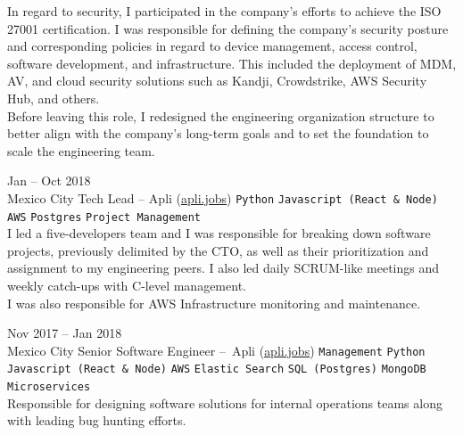 \documentclass[9pt]{developercv} %
\begin{document}
\begin{entrylist}
{            In regard to security, I participated in the company's efforts to achieve the ISO 27001 
            certification. I was responsible for defining the company's security posture and 
            corresponding policies in regard to device management, access control, software 
            development, and infrastructure. This included the deployment of MDM, AV, and cloud 
            security solutions such as Kandji, Crowdstrike, AWS Security Hub, and others.\\

            Before leaving this role, I redesigned the engineering organization structure to better 
            align with the company's long-term goals and to set the foundation to scale the 
            engineering team.
        }

    \entry
        {
            Jan -- Oct 2018
            \\\footnotesize{Mexico City}
        }
        {Tech Lead – Apli ({\href{https://apli.jobs/}{\underline{apli.jobs}}})}
        {
            \texttt{Python}
            \slashsep\texttt{Javascript (React \& Node)}
            \slashsep\texttt{AWS}
            \slashsep\texttt{Postgres}
            \slashsep\texttt{Project Management}
        }
        {\\

            I led a five-developers team and I was responsible for breaking down software projects, 
            previously delimited by the CTO, as well as their prioritization and assignment to my 
            engineering peers. I also led daily SCRUM-like meetings and weekly catch-ups with C-level
            management.\\
            
            I was also responsible for AWS Infrastructure monitoring and maintenance.
        }

    \entry
        {
            Nov 2017 -- Jan 2018
            \\\footnotesize{Mexico City}
        }
        {Senior Software Engineer – Apli ({\href{https://apli.jobs/}{\underline{apli.jobs}}})}
        {
            \texttt{Management}
            \slashsep\texttt{Python}
            \slashsep\texttt{Javascript (React \& Node)}
            \slashsep\texttt{AWS}
            \slashsep\texttt{Elastic Search}
            \slashsep\texttt{SQL (Postgres)}
            \slashsep\texttt{MongoDB}
            \slashsep\texttt{Microservices}
        }
        {\\
            Responsible for designing software solutions for internal operations teams along with 
            leading bug hunting efforts.
        }


\end{entrylist}
\end{document}
